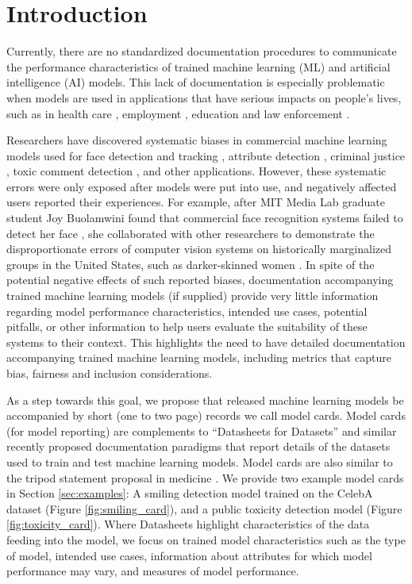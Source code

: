 \documentclass[format=sigconf]{acmart}
\begin{document}
\section{Introduction}
Currently, there are no standardized documentation procedures to communicate the performance characteristics of trained machine learning (ML) and artificial intelligence (AI) models. This lack of documentation is especially problematic when models are used in applications that have serious impacts on people's lives, such as in health care \cite{nervana,innereye,digital_reasoning}, employment \cite{ideal,avrio,entelo}, education \cite{gooru,turnitin} and law enforcement \cite{FBI2012,garvie2016,ProPublica2016,ftc_2016}.

Researchers have discovered systematic biases in commercial machine learning models used for face detection and tracking \cite{Desi09,Wang2010,buolamwini2016ted}, attribute detection \cite{BuolamwiniGebru2018}, criminal justice \cite{COMPAS2016}, toxic comment detection \cite{DixonEtAl2018}, and other applications. However, these systematic errors were only exposed after models were put into use, and negatively affected users reported their experiences. For example, after MIT Media Lab graduate student Joy Buolamwini found that commercial face recognition systems failed to detect her face \cite{buolamwini2016ted}, she collaborated with other researchers to demonstrate the disproportionate errors of computer vision systems on historically marginalized groups in the United States, such as darker-skinned women \cite{BuolamwiniGebru2018,WakandaScorecard}. 
In spite of the potential negative effects of such reported biases,  
documentation accompanying trained machine learning models (if supplied) provide very little information regarding model performance characteristics, intended use cases, potential pitfalls, or other information to help users evaluate the suitability of these systems to their context. 
This highlights the need to have detailed documentation accompanying trained machine learning models, including metrics that capture bias, fairness and inclusion considerations. 

As a step towards this goal, we propose that released machine learning models be accompanied by short (one to two page) records we call model cards.  Model cards (for model reporting) are complements to ``Datasheets for Datasets'' \cite{GebruEtAl2018} and similar recently proposed documentation paradigms \cite{HollandEtAl2018,statements} that report details of the datasets used to train and test machine learning models. Model cards are also similar to the {\sc tripod} statement proposal in medicine \cite{tripod}.  We provide two example model cards in Section \ref{sec:examples}: A smiling detection model trained on the CelebA dataset \cite{LiuEtAl2015} (Figure \ref{fig:smiling_card}), and a public toxicity detection model \cite{perspective_api} (Figure \ref{fig:toxicity_card}). Where Datasheets highlight characteristics of the data feeding into the model, we focus on trained model characteristics such as the type of model, intended use cases, information about attributes for which model performance may vary, and measures of model performance. 
\end{document}
